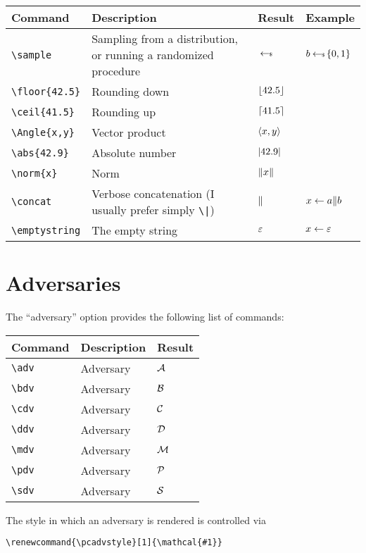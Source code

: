 \documentclass[a4paper]{report}
\begin{document}
\begin{center}
\begin{tabular}{l p{6cm} l l}
\textbf{Command} & \textbf{Description} & \textbf{Result} & \textbf{Example}  \\\hline
\lstinline$\sample$ & Sampling from a distribution, or running a randomized procedure & $\hskip2.3pt{\gets\!\!\mbox{\tiny${\$}$\normalsize}}\,$ & $b \hskip2.3pt{\gets\!\!\mbox{\tiny${\$}$\normalsize}}\, \{0,1\}$ \\
\lstinline$\floor{42.5}$ & Rounding down & $\left\lfloor 42.5\right\rfloor$ &  \\
\lstinline$\ceil{41.5}$ & Rounding up & $\left\lceil 41.5\right\rceil$ &  \\
\lstinline$\Angle{x,y}$ & Vector product & $\left\langle x,y\right\rangle$ &  \\
\lstinline$\abs{42.9}$ & Absolute number & $\left\lvert 42.9 \right\rvert$ &  \\
\lstinline$\norm{x}$ & Norm & $\left\|x\right\|$ & \\
\lstinline$\concat$ & Verbose concatenation (I usually prefer simply \lstinline$\|$) & $\|$ & $x \gets a\| b$ \\
\lstinline$\emptystring$ & The empty string & $\varepsilon$ & $x \gets \varepsilon$
\end{tabular}
\end{center}

\section{Adversaries}
The \enquote{adversary} option provides the following list of commands:

\begin{center}
\begin{tabular}{l l l}
\textbf{Command} & \textbf{Description} & \textbf{Result} \\\hline
\lstinline$\adv$ & Adversary & $\adv$  \\
\lstinline$\bdv$ & Adversary & $\bdv$  \\
\lstinline$\cdv$ & Adversary & $\cdv$  \\
\lstinline$\ddv$ & Adversary & $\ddv$  \\
\lstinline$\mdv$ & Adversary & $\mdv$  \\
\lstinline$\pdv$ & Adversary & $\pdv$  \\
\lstinline$\sdv$ & Adversary & $\sdv$
\end{tabular}
\end{center}

The style in which an adversary is rendered is controlled via
\begin{lstlisting}
\renewcommand{\pcadvstyle}[1]{\mathcal{#1}}
\end{lstlisting}
\end{document}
